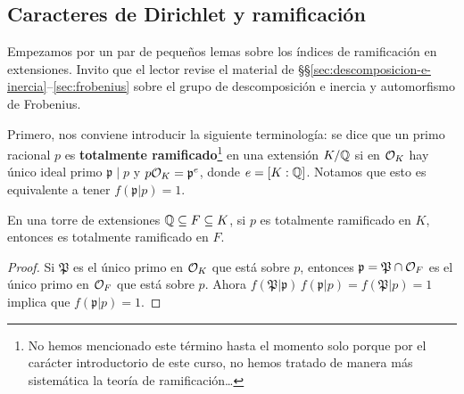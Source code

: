\subsection{Caracteres de Dirichlet y ramificación}

Empezamos por un par de pequeños lemas sobre los índices de ramificación en
extensiones. Invito que el lector revise el material de
\S\S\ref{sec:descomposicion-e-inercia}--\ref{sec:frobenius} sobre el grupo
de descomposición e inercia y automorfismo de Frobenius.

Primero, nos conviene introducir la siguiente terminología: se dice que un primo
racional $p$ es \textbf{totalmente ramificado}\footnote{No hemos mencionado este
  término hasta el momento solo porque por el carácter introductorio de este
  curso, no hemos tratado de manera más sistemática la teoría de
  ramificación\ldots} en una extensión $K/\mathbb{Q}$ si en $\mathcal{O}_K$ hay único ideal
primo $\mathfrak{p}\mid p$ y $p\mathcal{O}_K = \mathfrak{p}^e$, donde
$e = [K : \mathbb{Q}]$. Notamos que esto es equivalente a tener
$f (\mathfrak{p}|p) = 1$.

\begin{lema}
  En una torre de extensiones $\mathbb{Q} \subseteq F \subseteq K$,
  si $p$ es totalmente ramificado en $K$, entonces es totalmente ramificado en
  $F$.

  \begin{proof}
    Si $\mathfrak{P}$ es el único primo en $\mathcal{O}_K$ que está sobre $p$, entonces
    $\mathfrak{p} = \mathfrak{P}\cap \mathcal{O}_F$ es el único primo en $\mathcal{O}_F$
    que está sobre $p$. Ahora
    $f (\mathfrak{P}|\mathfrak{p})\,f (\mathfrak{p}|p) = f (\mathfrak{P}|p) = 1$
    implica que $f (\mathfrak{p}|p) = 1$.
  \end{proof}
\end{lema}

